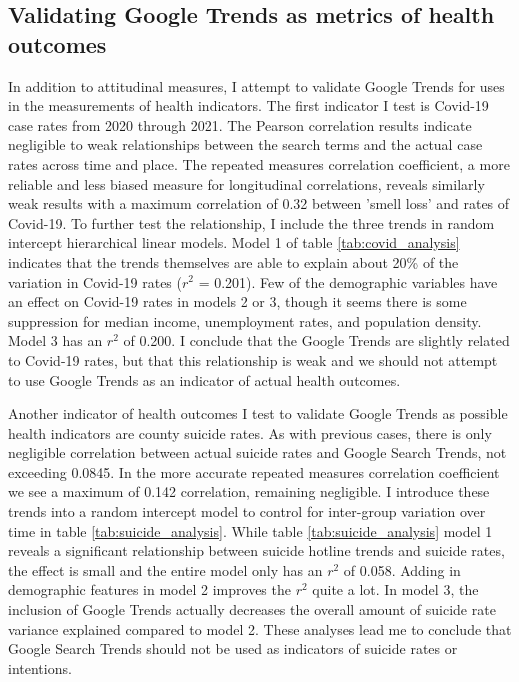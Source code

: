 

\subsection{Validating Google Trends as metrics of health outcomes}

In addition to attitudinal measures, I attempt to validate Google Trends for
uses in the measurements of health indicators. The first indicator I test is
Covid-19 case rates from 2020 through 2021. The Pearson correlation results
indicate negligible to weak relationships between the search terms and the
actual case rates across time and place. The repeated measures correlation
coefficient, a more reliable and less biased measure for longitudinal
correlations, reveals similarly weak results with a maximum correlation of 0.32
between 'smell loss' and rates of Covid-19. To further test the relationship, I
include the three trends in random intercept hierarchical linear models. Model 1
of table \ref{tab:covid_analysis} indicates that the trends themselves are able
to explain about 20\% of the variation in Covid-19 rates ($r^2$ = 0.201). Few
of the demographic variables have an effect on Covid-19 rates in models 2 or 3,
though it seems there is some suppression for median income, unemployment rates,
and population density. Model 3 has an $r^2$ of 0.200. I conclude that the
Google Trends are slightly related to Covid-19 rates, but that this relationship
is weak and we should not attempt to use Google Trends as an indicator of actual
health outcomes.



Another indicator of health outcomes I test to validate Google Trends as
possible health indicators are county suicide rates. As with previous cases,
there is only negligible correlation between actual suicide rates and Google
Search Trends, not exceeding 0.0845. In the more accurate repeated measures
correlation coefficient we see a maximum of 0.142 correlation, remaining
negligible. I introduce these trends into a random intercept model to control
for inter-group variation over time in table \ref{tab:suicide_analysis}. While
table \ref{tab:suicide_analysis} model 1 reveals a significant relationship
between suicide hotline trends and suicide rates, the effect is small and the
entire model only has an $r^2$ of 0.058. Adding in demographic features in model
2 improves the $r^2$ quite a lot. In model 3, the inclusion of Google Trends
actually decreases the overall amount of suicide rate variance explained
compared to model 2. These analyses lead me to conclude that Google Search
Trends should not be used as indicators of suicide rates or intentions.

